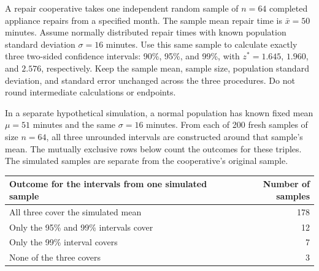 A repair cooperative takes one independent random sample of $n=64$ completed appliance repairs from a specified month. The sample mean repair time is $\bar{x}=50$ minutes. Assume normally distributed repair times with known population standard deviation $\sigma=16$ minutes. Use this same sample to calculate exactly three two-sided confidence intervals: 90\%, 95\%, and 99\%, with $z^*=1.645$, $1.960$, and $2.576$, respectively. Keep the sample mean, sample size, population standard deviation, and standard error unchanged across the three procedures. Do not round intermediate calculations or endpoints.

In a separate hypothetical simulation, a normal population has known fixed mean $\mu=51$ minutes and the same $\sigma=16$ minutes. From each of 200 fresh samples of size $n=64$, all three unrounded intervals are constructed around that sample's mean. The mutually exclusive rows below count the outcomes for these triples. The simulated samples are separate from the cooperative's original sample.

\begin{center}
\begin{tabular}{@{}lr@{}}
    \toprule
    Outcome for the intervals from one simulated sample & Number of samples \\
    \midrule
    All three cover the simulated mean & 178 \\
    Only the 95\% and 99\% intervals cover & 12 \\
    Only the 99\% interval covers & 7 \\
    None of the three covers & 3 \\
    \bottomrule
\end{tabular}
\end{center}


